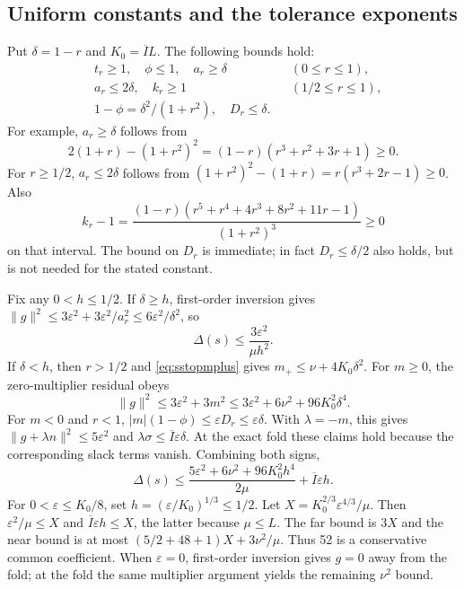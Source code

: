 \documentclass[10pt,a4paper]{article}
\begin{document}
\subsection{Uniform constants and the tolerance exponents}
Put $\delta=1-r$ and $K_0=\overline I L$. The following bounds hold:
\begin{equation}
 \begin{aligned}
 &t_r\ge1,\quad \phi\le1,\quad a_r\ge\delta &&(0\le r\le1),\\
 &a_r\le2\delta,\quad k_r\ge1 &&(1/2\le r\le1),\\
 &1-\phi=\delta^2/(1+r^2),\quad D_r\le\delta.
 \end{aligned}
 \label{eq:sstopgeometrybounds}
\end{equation}
For example, $a_r\ge\delta$ follows from
\begin{equation*}
 2(1+r)-(1+r^2)^2=(1-r)(r^3+r^2+3r+1)\ge0.
\end{equation*}
For $r\ge1/2$, $a_r\le2\delta$ follows from $(1+r^2)^2-(1+r)=r(r^3+2r-1)\ge0$. Also
\begin{equation*}
 k_r-1=\frac{(1-r)(r^5+r^4+4r^3+8r^2+11r-1)}{(1+r^2)^3}\ge0
\end{equation*}
on that interval. The bound on $D_r$ is immediate; in fact $D_r\le\delta/2$ also holds, but is not needed for the stated constant.

Fix any $0<h\le1/2$. If $\delta\ge h$, first-order inversion gives $\|g\|^2\le3\varepsilon^2+3\varepsilon^2/a_r^2\le6\varepsilon^2/\delta^2$, so
\begin{equation}
 \Delta(s)\le\frac{3\varepsilon^2}{\mu h^2}.
 \label{eq:sstopfar}
\end{equation}
If $\delta<h$, then $r>1/2$ and \eqref{eq:sstopmplus} gives $m_+\le\nu+4K_0\delta^2$. For $m\ge0$, the zero-multiplier residual obeys
\begin{equation}
 \|g\|^2\le3\varepsilon^2+3m^2
 \le3\varepsilon^2+6\nu^2+96K_0^2\delta^4.
 \label{eq:sstoppositive}
\end{equation}
For $m<0$ and $r<1$, $|m|(1-\phi)\le\varepsilon D_r\le\varepsilon\delta$. With $\lambda=-m$, this gives $\|g+\lambda n\|^2\le5\varepsilon^2$ and $\lambda\sigma\le\overline I\varepsilon\delta$. At the exact fold these claims hold because the corresponding slack terms vanish. Combining both signs,
\begin{equation}
 \Delta(s)\le\frac{5\varepsilon^2+6\nu^2+96K_0^2h^4}{2\mu}
                   +\overline I\varepsilon h.
 \label{eq:sstopnear}
\end{equation}
For $0<\varepsilon\le K_0/8$, set $h=(\varepsilon/K_0)^{1/3}\le1/2$. Let $X=K_0^{2/3}\varepsilon^{4/3}/\mu$. Then $\varepsilon^2/\mu\le X$ and $\overline I\varepsilon h\le X$, the latter because $\mu\le L$. The far bound is $3X$ and the near bound is at most $(5/2+48+1)X+3\nu^2/\mu$. Thus 52 is a conservative common coefficient. When $\varepsilon=0$, first-order inversion gives $g=0$ away from the fold; at the fold the same multiplier argument yields the remaining $\nu^2$ bound.
\end{document}
